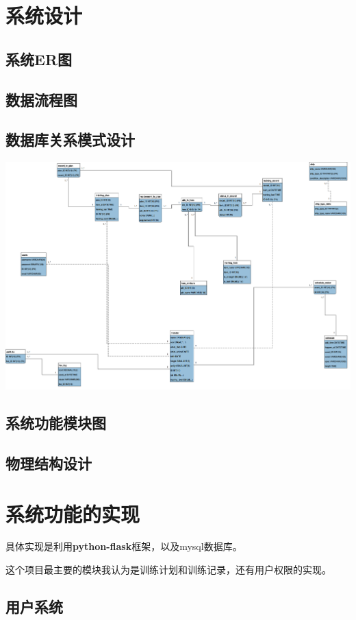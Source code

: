 \section{系统设计}
\subsection{系统ER图}

\subsection{数据流程图}

\subsection{数据库关系模式设计}
\includegraphics[width=\textwidth]{figure/relation-schema}
\subsection{系统功能模块图}


\subsection{物理结构设计}


\section{系统功能的实现}
具体实现是利用\textbf{python-flask}框架，以及mysql数据库。

这个项目最主要的模块我认为是训练计划和训练记录，还有用户权限的实现。

\subsection{用户系统}
